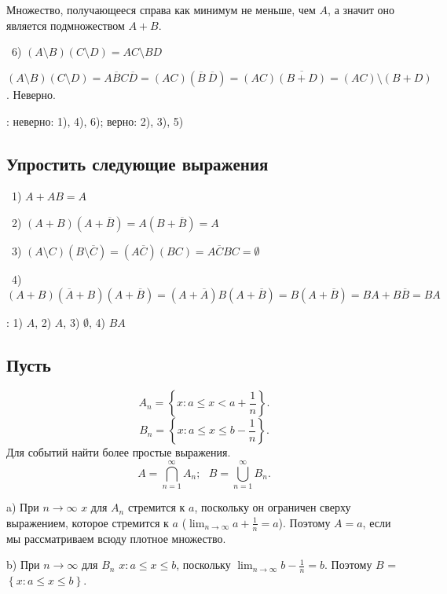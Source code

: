 \noindent Множество, получающееся справа как минимум не меньше, чем $A$, а значит оно является 
подмножеством $A + B$.

\medskip
\noindent~6) $\left(A \setminus B\right)\left(C \setminus D\right) = AC \setminus BD$

\noindent $\left(A \setminus B\right) \left(C \setminus D\right) = A\overline{B}C\overline{D} =
\left(AC\right)\left(\overline{B}~\overline{D}\right) = \left(AC\right)\overline{\left(
B + D\right)} = \left(AC\right) \setminus \left(B + D\right)$. Неверно.

\bigskip
{}: неверно: 1), 4), 6); верно: 2), 3), 5)


\subsection{Упростить следующие выражения}

\noindent~1) $A + AB = A$ 

\medskip
\noindent~2) $\left(A + B\right)\left(A + \overline{B}\right) = A \left(B + \overline{B}\right) = A$

\medskip
\noindent~3) $\left(A \setminus C\right)\left(B \setminus \overline{C}\right) = \left(A\overline{C}\right)
\left(BC\right) = A\overline{C}BC = \emptyset$

\medskip
\noindent~4) $\left(A + B\right)\left(\overline{A} + B\right)\left(A + \overline{B}\right) = 
\left(A + \overline{A}\right)B\left(A + \overline{B}\right) = B\left(A + \overline{B}\right) = 
BA + B\overline{B} = BA$

\bigskip
{}: 1) $A$, 2) $A$, 3) $\emptyset$, 4) $BA$


\subsection{Пусть}
\[
  A_n = \left\{x: a \le x < a + \frac{1}{n}\right\} 
.\] 
\[
  B_n = \left\{x: a \le x \le b - \frac{1}{n}\right\} 
.\] 
Для событий найти более простые выражения.
\[
  A = \bigcap_{n = 1}^{\infty} A_n;~~~ B = \bigcup_{n = 1}^\infty B_n
.\] 

\noindent a) При $n \to \infty$ $x$ для $A_n$ стремится к $a$, поскольку он ограничен сверху
выражением, которое стремится к $a$ ($\lim_{n \to \infty} a + \frac{1}{n} = a$). Поэтому $A = a$, если мы рассматриваем всюду плотное множество.

\medskip
\noindent b) При $n \to \infty$ для $B_n$ $x : a \le x \le b$, поскольку $\lim_{n \to \infty} b - \frac{1}{n} = b $.
Поэтому $B$ = $\left\{x: a \le x \le b\right\}$.

